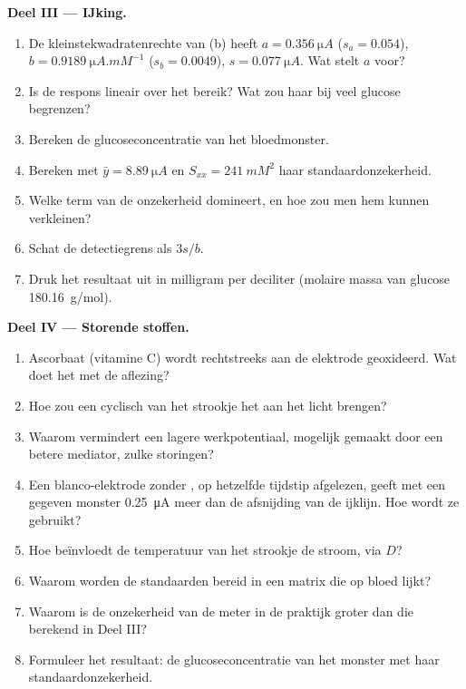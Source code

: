 \begin{problem}
\medskip\noindent\textbf{Deel III --- IJking.}
\begin{enumerate}[resume]
  \item De kleinstekwadratenrechte van (b) heeft $a = \qty{0.356}{\micro A}$ ($s_a = 0.054$), $b =
        \qty{0.9189}{\micro A.mM^{-1}}$ ($s_b = 0.0049$), $s = \qty{0.077}{\micro A}$. Wat stelt $a$ voor?
  \item Is de respons lineair over het bereik? Wat zou haar bij veel glucose
        begrenzen?
  \item Bereken de glucoseconcentratie van het bloedmonster.
  \item Bereken met $\bar y = \qty{8.89}{\micro A}$ en $S_{xx} = \qty{241}{mM^2}$ haar standaardonzekerheid.
  \item Welke term van de onzekerheid domineert, en hoe zou men hem kunnen
        verkleinen?
  \item Schat de detectiegrens als $3s/b$.
  \item Druk het resultaat uit in milligram per deciliter (molaire massa
        van glucose
        \qty{180.16}{g/mol}).
\end{enumerate}

\medskip\noindent\textbf{Deel IV --- Storende stoffen.}
\begin{enumerate}[resume]
  \item Ascorbaat (vitamine C) wordt rechtstreeks aan de elektrode
        geoxideerd. Wat doet het met de aflezing?
  \item Hoe zou een cyclisch  van het strookje het aan het
        licht brengen?
  \item Waarom vermindert een lagere werkpotentiaal, mogelijk gemaakt door
        een betere mediator, zulke storingen?
  \item Een blanco-elektrode zonder , op hetzelfde tijdstip afgelezen,
        geeft met een gegeven monster \qty{0.25}{\micro A} meer dan de
        afsnijding van de ijklijn. Hoe wordt ze gebruikt?
  \item Hoe beïnvloedt de temperatuur van het strookje de stroom, via $D$?
  \item Waarom worden de standaarden bereid in een matrix die op bloed
        lijkt?
  \item Waarom is de onzekerheid van de meter in de praktijk groter dan die
        berekend in Deel III?
  \item Formuleer het resultaat: de glucoseconcentratie van het monster met
        haar standaardonzekerheid.
\end{enumerate}
\end{problem}
